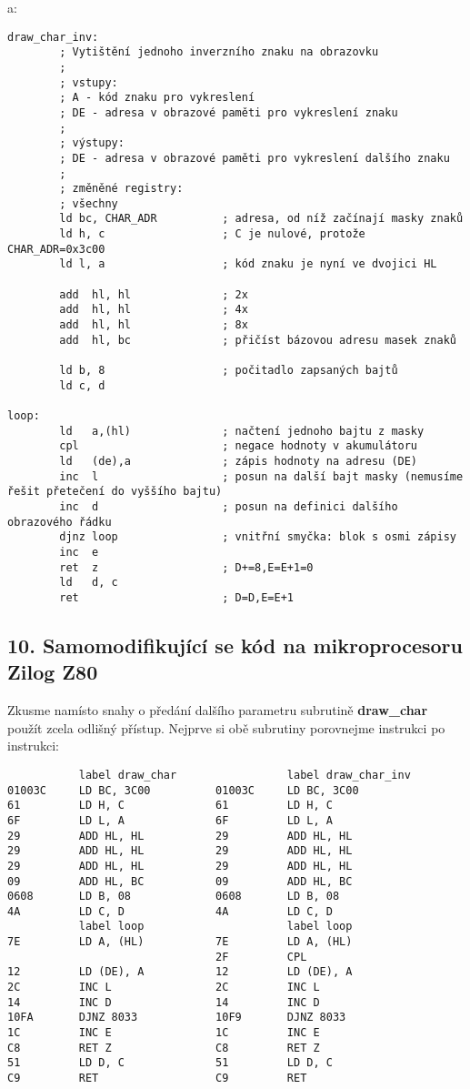 \documentclass{article}
\begin{document}
a:

\begin{verbatim}
draw_char_inv:
        ; Vytištění jednoho inverzního znaku na obrazovku
        ;
        ; vstupy:
        ; A - kód znaku pro vykreslení
        ; DE - adresa v obrazové paměti pro vykreslení znaku
        ;
        ; výstupy:
        ; DE - adresa v obrazové paměti pro vykreslení dalšího znaku
        ;
        ; změněné registry:
        ; všechny
        ld bc, CHAR_ADR          ; adresa, od níž začínají masky znaků
        ld h, c                  ; C je nulové, protože CHAR_ADR=0x3c00
        ld l, a                  ; kód znaku je nyní ve dvojici HL
 
        add  hl, hl              ; 2x
        add  hl, hl              ; 4x
        add  hl, hl              ; 8x
        add  hl, bc              ; přičíst bázovou adresu masek znaků
 
        ld b, 8                  ; počitadlo zapsaných bajtů
        ld c, d
 
loop:
        ld   a,(hl)              ; načtení jednoho bajtu z masky
        cpl                      ; negace hodnoty v akumulátoru
        ld   (de),a              ; zápis hodnoty na adresu (DE)
        inc  l                   ; posun na další bajt masky (nemusíme řešit přetečení do vyššího bajtu)
        inc  d                   ; posun na definici dalšího obrazového řádku
        djnz loop                ; vnitřní smyčka: blok s osmi zápisy
        inc  e
        ret  z                   ; D+=8,E=E+1=0
        ld   d, c
        ret                      ; D=D,E=E+1
\end{verbatim}

\hypertarget{k10}{%
\subsection{10. Samomodifikující se kód na mikroprocesoru Zilog
Z80}\label{k10}}

Zkusme namísto snahy o předání dalšího parametru subrutině
\textbf{draw\_char} použít zcela odlišný přístup. Nejprve si obě
subrutiny porovnejme instrukci po instrukci:

\begin{verbatim}
           label draw_char                 label draw_char_inv
01003C     LD BC, 3C00          01003C     LD BC, 3C00
61         LD H, C              61         LD H, C
6F         LD L, A              6F         LD L, A
29         ADD HL, HL           29         ADD HL, HL
29         ADD HL, HL           29         ADD HL, HL
29         ADD HL, HL           29         ADD HL, HL
09         ADD HL, BC           09         ADD HL, BC
0608       LD B, 08             0608       LD B, 08
4A         LD C, D              4A         LD C, D
           label loop                      label loop
7E         LD A, (HL)           7E         LD A, (HL)
                                2F         CPL
12         LD (DE), A           12         LD (DE), A
2C         INC L                2C         INC L
14         INC D                14         INC D
10FA       DJNZ 8033            10F9       DJNZ 8033
1C         INC E                1C         INC E
C8         RET Z                C8         RET Z
51         LD D, C              51         LD D, C
C9         RET                  C9         RET
\end{verbatim}
\end{document}
